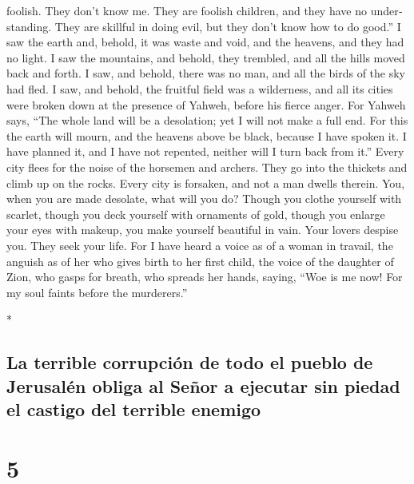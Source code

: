 \begin{paracol}{2}
\begin{otherlanguage}{english}
foolish. They don't know me. They are foolish children, and they have no
understanding. They are skillful in doing evil, but they don't know how
to do good.''  I saw the earth and, behold, it was waste
and void, and the heavens, and they had no light.  I saw
the mountains, and behold, they trembled, and all the hills moved back
and forth.  I saw, and behold, there was no man, and all
the birds of the sky had fled.  I saw, and behold, the
fruitful field was a wilderness, and all its cities were broken down at
the presence of Yahweh, before his fierce anger.  For
Yahweh says, ``The whole land will be a desolation; yet I will not make
a full end.  For this the earth will mourn, and the
heavens above be black, because I have spoken it. I have planned it, and
I have not repented, neither will I turn back from it.'' 
Every city flees for the noise of the horsemen and archers. They go into
the thickets and climb up on the rocks. Every city is forsaken, and not
a man dwells therein.  You, when you are made desolate,
what will you do? Though you clothe yourself with scarlet, though you
deck yourself with ornaments of gold, though you enlarge your eyes with
makeup, you make yourself beautiful in vain. Your lovers despise you.
They seek your life.  For I have heard a voice as of a
woman in travail, the anguish as of her who gives birth to her first
child, the voice of the daughter of Zion, who gasps for breath, who
spreads her hands, saying, ``Woe is me now! For my soul faints before
the murderers.''

\end{otherlanguage}

\switchcolumn[0]*

\hypertarget{la-terrible-corrupciuxf3n-de-todo-el-pueblo-de-jerusaluxe9n-obliga-al-seuxf1or-a-ejecutar-sin-piedad-el-castigo-del-terrible-enemigo}{%
\subsection{La terrible corrupción de todo el pueblo de Jerusalén obliga
al Señor a ejecutar sin piedad el castigo del terrible
enemigo}\label{la-terrible-corrupciuxf3n-de-todo-el-pueblo-de-jerusaluxe9n-obliga-al-seuxf1or-a-ejecutar-sin-piedad-el-castigo-del-terrible-enemigo}}

\hypertarget{section-8}{%
\section{5}\label{section-8}}


\end{paracol}
